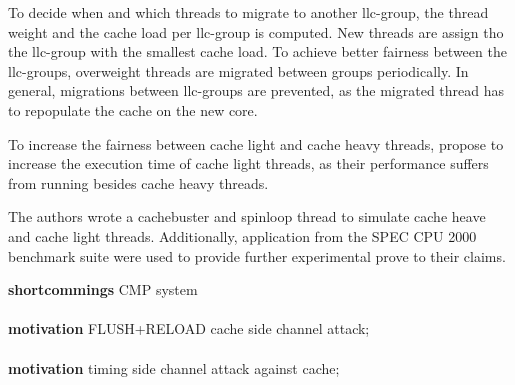 To decide when and which threads to migrate to another \gls{llc}-group, the
thread weight and the cache load per \gls{llc}-group is computed.
New threads are assign tho the \gls{llc}-group with the smallest cache load.
To achieve better fairness between the \gls{llc}-groups, overweight threads are
migrated between groups periodically.
In general, migrations between \gls{llc}-groups are prevented, as the migrated
thread has to repopulate the cache on the new core.

To increase the fairness between cache light and cache heavy threads,
\citeauthor{knauerhase_using_2008} propose to increase the execution time of
cache light threads, as their performance suffers from running besides cache
heavy threads.

The authors wrote a cachebuster and spinloop thread to simulate cache heave and
cache light threads. Additionally, application from the SPEC CPU 2000 benchmark
suite were used to provide further experimental prove to their claims.

\textbf{ shortcommings } CMP system


\paragraph{ \cite{yarom_recovering_2014} }
\textbf{motivation} FLUSH+RELOAD cache side channel attack;

\paragraph{ \cite{bernstein_cache-timing_2005} }
\textbf{motivation} timing side channel attack against cache;



\paragraph{ \cite{eyerman_probabilistic_2010} }

\paragraph{ \cite{fedorova_managing_2010} }
\paragraph{ \cite{zhuravlev_addressing_2010} }
\paragraph{ \cite{liu_last-level_2015} }
